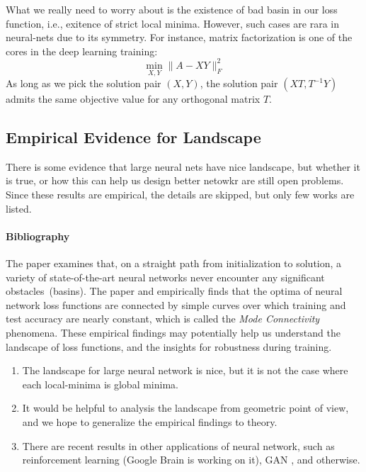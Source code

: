 What we really need to worry about is the existence of bad basin in our loss function, i.e., exitence of strict local minima. However, such cases are rara in neural-nets due to its symmetry. For instance, matrix factorization is one of the cores in the deep learning training:
\[
\min_{X,Y}\|A-XY\|_F^2
\]
As long as we pick the solution pair $(X,Y)$, the solution pair $(XT,T^{-1}Y)$ admits the same objective value for any orthogonal matrix $T$.

\subsection{Empirical Evidence for Landscape}
There is some evidence that large neural nets have nice landscape, but whether it is true, or how this can help us design better netowkr are still open problems.
Since these results are empirical, the details are skipped, but only few works are listed.
\paragraph{Bibliography}
The paper \citep{43404} examines that, on a straight path from initialization to solution, a variety of state-of-the-art neural networks never encounter any significant obstacles~(basins).
The paper \citep{NIPS2018_8095} and \citep{Gotmare2018} empirically finds that the optima of  neural network loss functions are connected by simple curves over which training and test
accuracy are nearly constant, which is called the \emph{Mode Connectivity} phenomena.
These empirical findings may potentially help us understand the landscape of loss functions, and the insights for robustness during training. 

\begin{remark}
\begin{enumerate}
\item
The landscape for large neural network is nice, but it is not the case where each local-minima is global minima.
\item
It would be helpful to analysis the landscape from geometric point of view, and we hope to generalize the empirical findings to theory.
\item
There are recent results in other applications of neural network, such as reinforcement learning (Google Brain is working on it), GAN \citep{DBLPkarol}, and otherwise.
\end{enumerate}


\end{remark}



